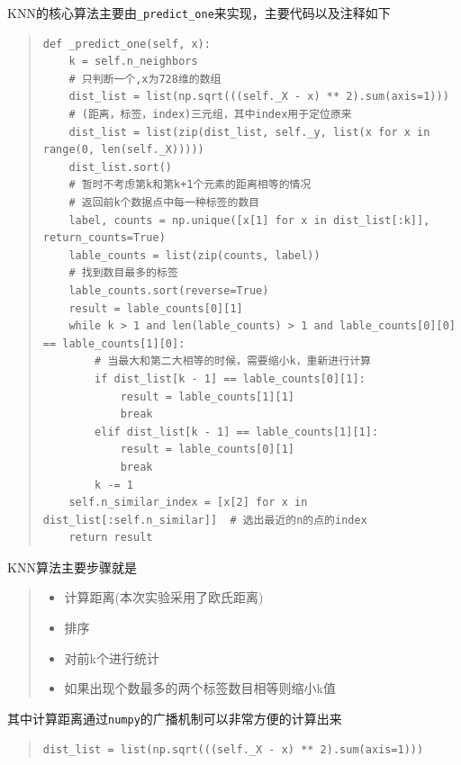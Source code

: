 \documentclass[UTF8]{ctexart}
\begin{document}
KNN的核心算法主要由\lstinline{_predict_one}来实现，主要代码以及注释如下



\begin{quote}
    \begin{lstlisting}[breaklines, title=\lstinline{_predict_one}方法]
def _predict_one(self, x):
    k = self.n_neighbors
    # 只判断一个,x为728维的数组
    dist_list = list(np.sqrt(((self._X - x) ** 2).sum(axis=1)))
    # (距离，标签，index)三元组，其中index用于定位原来
    dist_list = list(zip(dist_list, self._y, list(x for x in range(0, len(self._X)))))
    dist_list.sort()
    # 暂时不考虑第k和第k+1个元素的距离相等的情况
    # 返回前k个数据点中每一种标签的数目
    label, counts = np.unique([x[1] for x in dist_list[:k]], return_counts=True)
    lable_counts = list(zip(counts, label))
    # 找到数目最多的标签
    lable_counts.sort(reverse=True)
    result = lable_counts[0][1]
    while k > 1 and len(lable_counts) > 1 and lable_counts[0][0] == lable_counts[1][0]:
        # 当最大和第二大相等的时候，需要缩小k，重新进行计算
        if dist_list[k - 1] == lable_counts[0][1]:
            result = lable_counts[1][1]
            break
        elif dist_list[k - 1] == lable_counts[1][1]:
            result = lable_counts[0][1]
            break
        k -= 1
    self.n_similar_index = [x[2] for x in dist_list[:self.n_similar]]  # 选出最近的n的点的index
    return result
    \end{lstlisting}
\end{quote}

KNN算法主要步骤就是
\begin{quote}
    \begin{itemize}
        \item 计算距离(本次实验采用了欧氏距离)
        \item 排序
        \item 对前k个进行统计
        \item 如果出现个数最多的两个标签数目相等则缩小k值
    \end{itemize}
\end{quote}

其中计算距离通过\lstinline{numpy}的广播机制可以非常方便的计算出来
\begin{quote}
    \begin{lstlisting}[breaklines, frame=tb, numbers=none]
dist_list = list(np.sqrt(((self._X - x) ** 2).sum(axis=1)))
    \end{lstlisting}
\end{quote}
\end{document}
